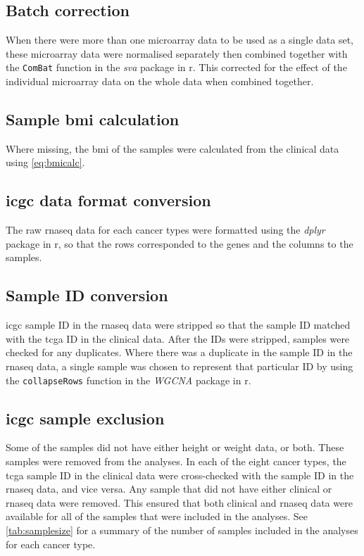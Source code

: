 \subsection{Batch correction}
\label{sub:batch_correction}

When there were more than one microarray data to be used as a single data set, these microarray data were normalised separately then combined together with the \texttt{ComBat} function in the \textit{sva} package in \gls{r}.
This corrected for the effect of the individual microarray data on the whole data when combined together.

\subsection{Sample \gls{bmi} calculation}
\label{sub:sample_bmi_calculation}

Where missing, the \gls{bmi} of the samples were calculated from the clinical data using \cref{eq:bmicalc}.

\subsection{\gls{icgc} data format conversion}
\label{sub:icgc_data_format_conversion}

The raw \gls{rnaseq} data for each cancer types were formatted using the \textit{dplyr} package in \gls{r}, so that the rows corresponded to the genes and the columns to the samples.

\subsection{Sample ID conversion}
\label{sub:sample_id_conversion}

\gls{icgc} sample ID in the \gls{rnaseq} data were stripped so that the sample ID matched with the \gls{tcga} ID in the clinical data.
After the IDs were stripped, samples were checked for any duplicates.
Where there was a duplicate in the sample ID in the \gls{rnaseq} data, a single sample was chosen to represent that particular ID by using the \texttt{collapseRows} function in the \textit{WGCNA} package in \gls{r}.

\subsection{\gls{icgc} sample exclusion}
\label{sub:icgc_sample_exclusion}

Some of the samples did not have either height or weight data, or both.
These samples were removed from the analyses.
In each of the eight cancer types, the \gls{tcga} sample ID in the clinical data were cross-checked with the sample ID in the \gls{rnaseq} data, and vice versa.
Any sample that did not have either clinical or \gls{rnaseq} data were removed.
This ensured that both clinical and \gls{rnaseq} data were available for all of the samples that were included in the analyses.
See \cref{tab:samplesize} for a summary of the number of samples included in the analyses for each cancer type.

